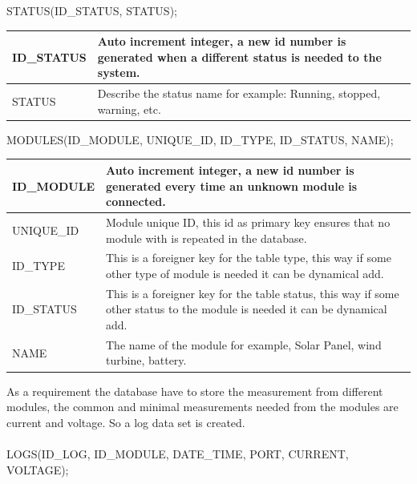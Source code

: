 STATUS(ID\_STATUS, STATUS);

\begin{table}[H]
\centering
	\begin{tabular}{| p{2cm} | p{10cm} |}
		\hline
		ID\_STATUS & Auto increment integer, a new id number is generated when a different status is needed to the system. \\\hline
		STATUS & Describe the status name for example: Running, stopped, warning, etc.\\\hline
	\end{tabular}
\end{table}


MODULES(ID\_MODULE, UNIQUE\_ID, ID\_TYPE, ID\_STATUS, NAME);

\begin{table}[H]
\centering
	\begin{tabular}{| p{2cm} | p{10cm} |}
		\hline
		ID\_MODULE & Auto increment integer, a new id number is generated every time an unknown module is connected. \\\hline
		UNIQUE\_ID & Module unique ID, this id as primary key ensures that no module with is repeated in the database.\\\hline
		ID\_TYPE & This is a foreigner key for the table type, this way if some other type of module is needed it can be dynamical add. \\\hline
		ID\_STATUS & This is a foreigner key for the table status, this way if some other status to the module is needed it can be dynamical add. \\\hline
		NAME & The name of the module for example, Solar Panel, wind turbine, battery. \\\hline
	\end{tabular}
\end{table}
As a requirement the database have to store the measurement  from different modules, the common and minimal measurements needed from the modules are current and voltage. So a log data set is created.
\\\\

LOGS(ID\_LOG, ID\_MODULE, DATE\_TIME, PORT, CURRENT, VOLTAGE);


